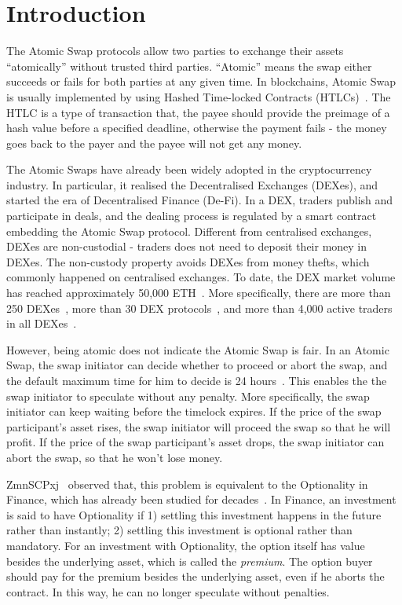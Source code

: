 \section{Introduction}
\label{sec:intro}

The Atomic Swap protocols allow two parties to exchange their assets ``atomically'' without trusted third parties.
``Atomic'' means the swap either succeeds or fails for both parties at any given time.
In blockchains, Atomic Swap is usually implemented by using Hashed Time-locked Contracts (HTLCs)~\cite{poon2016bitcoin}.
The HTLC is a type of transaction that, the payee should provide the preimage of a hash value before a specified deadline, otherwise the payment fails - the money goes back to the payer and the payee will not get any money.

The Atomic Swaps have already been widely adopted in the cryptocurrency industry.
In particular, it realised the Decentralised Exchanges (DEXes), and started the era of Decentralised Finance (De-Fi).
In a DEX, traders publish and participate in deals, and the dealing process is regulated by a smart contract embedding the Atomic Swap protocol.
Different from centralised exchanges, DEXes are non-custodial - traders does not need to deposit their money in DEXes.
The non-custody property avoids DEXes from money thefts, which commonly happened on centralised exchanges.
To date, the DEX market volume has reached approximately 50,000 ETH~\cite{dexwatch}.
More specifically,
there are more than 250 DEXes~\cite{distribuyed/index},
more than 30 DEX protocols~\cite{evbots/dex-protocols},
and more than 4,000 active traders in all DEXes~\cite{dexwatch}.



However, being atomic does not indicate the Atomic Swap is fair.
In an Atomic Swap, the swap initiator can decide whether to proceed or abort the swap, and the default maximum time for him to decide is 24 hours~\cite{nolan2013alt}.
This enables the the swap initiator to speculate without any penalty.
More specifically, the swap initiator can keep waiting before the timelock expires.
If the price of the swap participant's asset rises, the swap initiator will proceed the swap so that he will profit.
If the price of the swap participant's asset drops, the swap initiator can abort the swap, so that he won't lose money.

ZmnSCPxj~\cite{optionality-origin} observed that, this problem is equivalent to the Optionality in Finance, which has already been studied for decades~\cite{higham2004introduction}.
In Finance, an investment is said to have Optionality if
1) settling this investment happens in the future rather than instantly;
2) settling this investment is optional rather than mandatory.
For an investment with Optionality, the option itself has value besides the underlying asset, which is called the \textit{premium}.
The option buyer should pay for the premium besides the underlying asset, even if he aborts the contract.
In this way, he can no longer speculate without penalties.

